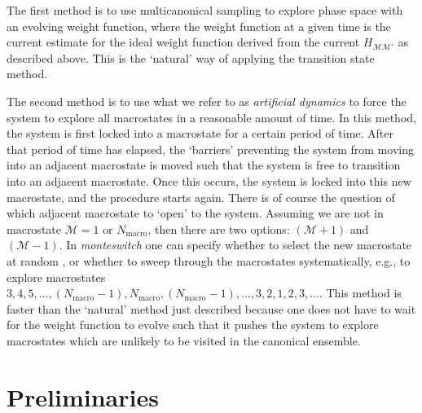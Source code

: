 \documentclass{report}
\begin{document}
The first method is to use multicanonical sampling to explore phase space with an evolving weight function, where the weight function
at a given time is the current estimate for the ideal weight function derived from the current $H_{\mathcal{M}\mathcal{M}'}$ as described above.
This is the `natural' way of applying the transition state method.

The second method is to use what we refer to as \emph{artificial dynamics} to force the system to explore all macrostates in a reasonable amount of time. 
In this method, the system is first locked into a macrostate for a certain period of time. After that period of time has elapsed, the `barriers' preventing
the system from moving into an adjacent macrostate is moved such that the system is free to transition into an adjacent macrostate. Once this occurs,
the system is locked into this new macrostate, and the procedure starts again. There is of course the question of which adjacent macrostate to `open'
to the system. Assuming we are not in macrostate $\mathcal{M}=1$ or $N_{\text{macro}}$, then there are two options: $(\mathcal{M}+1)$ and $(\mathcal{M}-1)$.
In \emph{monteswitch} one can specify whether to select the new macrostate at random \cite{thesis:Jackson}, 
or whether to sweep through the macrostates systematically, e.g.,
to explore macrostates $3,4,5,\dotsc,(N_{\text{macro}}-1),N_{\text{macro}},(N_{\text{macro}}-1),\dotsc,3,2,1,2,3,\dotsc$. This method is faster than the `natural'
method just described because one does not have to wait for the weight function to evolve such that it pushes the system to explore macrostates which
are unlikely to be visited in the canonical ensemble.




\chapter{Preliminaries}\label{chapter:preliminaries}
\end{document}
